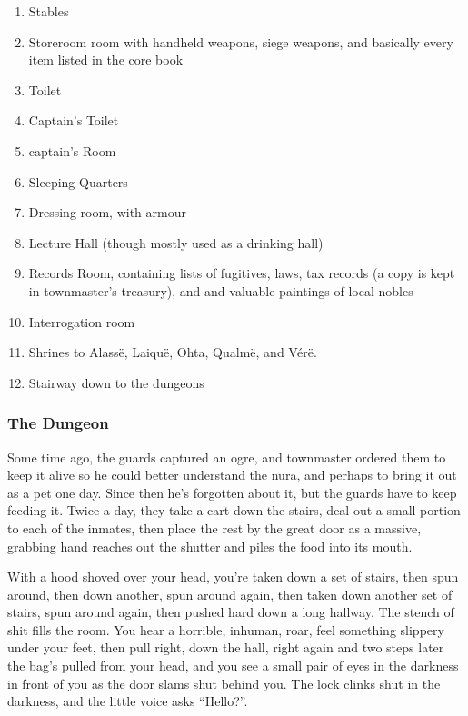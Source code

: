 \begin{multicols}{2}
\begin{enumerate}
	\item{Stables}
	\item{Storeroom room with handheld weapons, siege weapons, and basically every item listed in the core book}
	\item{Toilet}
	\item{Captain's Toilet}
	\item{\gls{captain}'s Room}
	\item{Sleeping Quarters}
	\item{Dressing room, with armour}
	\item{Lecture Hall (though mostly used as a drinking hall)}
	\item{Records Room, containing lists of fugitives, laws, tax records (a copy is kept in \gls{townmaster}'s treasury), and and valuable paintings of local nobles}
	\item{Interrogation room}
	\item{Shrines to Alass\"{e}, Laiqu\"{e}, Ohta, Qualm\"{e}, and V\'{e}r\"{e}.}
	\item{Stairway down to the dungeons}
\end{enumerate}

\subsubsection{The Dungeon}

Some time ago, the guards captured an ogre, and \gls{townmaster} ordered them to keep it alive so he could better understand the nura, and perhaps to bring it out as a pet one day.  Since then he's forgotten about it, but the guards have to keep feeding it.  Twice a day, they take a cart down the stairs, deal out a small portion to each of the inmates, then place the rest by the great door as a massive, grabbing hand reaches out the shutter and piles the food into its mouth.

\begin{boxtext}

	With a hood shoved over your head, you're taken down a set of stairs, then spun around, then down another, spun around again, then taken down another set of stairs, spun around again, then pushed hard down a long hallway.
	 The stench of shit fills the room.
	 You hear a horrible, inhuman, roar, feel something slippery under your feet, then pull right, down the hall, right again and two steps later the bag's pulled from your head, and you see a small pair of eyes in the darkness in front of you as the door slams shut behind you.
	 The lock clinks shut in the darkness, and the little voice asks ``Hello?''.


\end{boxtext}
\end{multicols}
